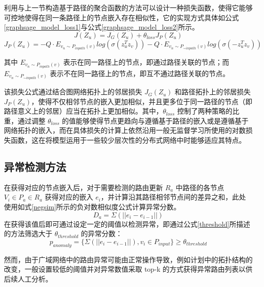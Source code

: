 利用与上一节构造基于路径的聚合函数的方法可以设计一种损失函数，使得它能够可控地使得在同一条路径上的节点嵌入存在相似性，它的实现方式具体如公式\ref{graphsage_model_loss1}与公式\ref{graphsage_model_loss2}所示。
\begin{equation} \label{graphsage_model_loss1}
J(Z_u) = J_G(Z_u) + \theta_{loss} J_P(Z_u)
\end{equation}
\begin{equation} \label{graphsage_model_loss2}
J_P(Z_u) = -Q \cdot E_{v_n \sim P_{inpath}(v)}log(\sigma(z_u^{T}z_v)) -Q \cdot E_{v_n \sim P_{\sim inpath}(v)}log(\sigma(-z_u^{T}z_v))
\end{equation}

其中 $E_{v_n \sim P_{inpath}(v)}$ 表示在同一路径上的节点，即通过路径关联的节点；而 $E_{v_n \sim P_{\sim inpath}(v)}$ 表示不在同一路径上的节点，即互不通过路径关联的节点。

该损失公式通过结合图网络拓扑上的邻居损失 $J_G(Z_u)$ 和路径拓扑上的邻居损失 $J_P(Z_u)$，使得不仅相邻节点的嵌入更加相似，并且更多位于同一路径的节点（即路径意义上的邻居）应当在拓扑上更加相似。其中，$\theta_{loss}$ 控制了两种策略的比重，通过调整 $\theta_{loss}$ 的值能够使得节点更趋向与遵循基于路径的嵌入或是遵循基于网络拓扑的嵌入，而在具体损失的计算上依然沿用一般无监督学习所使用的对数损失函数，这在将模型运用于一些较少层次性的分布式网络中时能够适应其特点。

\subsection{异常检测方法}

在获得对应的节点嵌入后，对于需要检测的路由更新 $R_a$ 中路径的各节点 $V_i \in P_a \in R_a$ 获得对应的嵌入 ${e_i}$，并计算沿其路径相邻节点间的差异之和，此处使用如式\ref{negsim}所示的负对数相似度公式计算异常分数。
\begin{equation} \label{negsim}
D_a = \Sigma(||e_i - e_{i-1}||)
\end{equation}
在获得该值后即可通过设定一定的阈值以检测异常，即通过公式\ref{threshold}所描述的方法筛选大于 $\theta_{threshold}$ 的异常分数：
\begin{equation} \label{threshold}
p_{anomaly} = \{ \Sigma(||e_i - e_{i-1}||), v_i \in P_{input} \} \geq \theta_{threshold}
\end{equation}

然而，由于广域网络中的路由异常可能由正常操作导致，例如计划中的拓扑结构的改变，一般设置较低的阈值并对异常数值采取 top-k 的方式获得异常路由列表以供后续人工分析。
